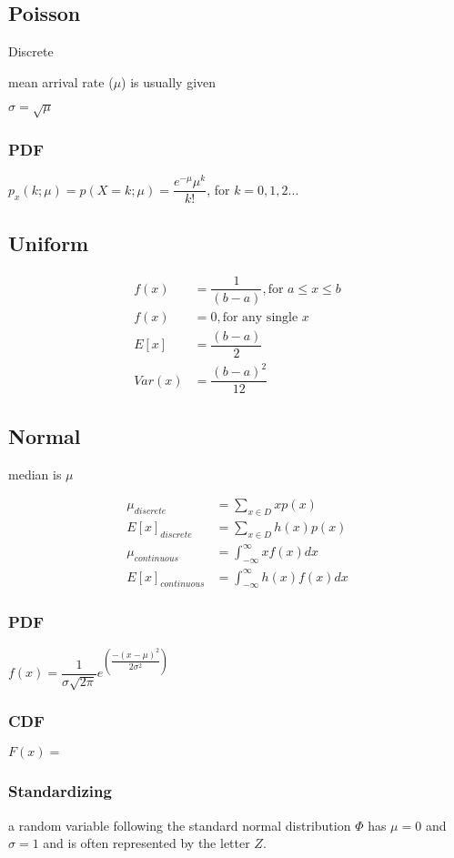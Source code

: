 \documentclass[12pt,fleqn]{article}
\begin{document}
\subsection{Poisson}
Discrete

mean arrival rate ($\mu$) is usually given

$\sigma = \sqrt{\mu}$

\subsubsection{PDF}
$p_x(k;\mu) = p(X=k; \mu) = \dfrac{e^{-\mu}\mu^k}{k!}$, for $k = 0,1,2...$
\subsection{Uniform}

\begin{align*}
	f(x) &= \dfrac{1}{(b-a)}, \text{for $a \le x \le b$}\\
	f(x) &= 0, \text{for any single $x$}\\
	E[x] &= \dfrac{(b-a)}{2}\\
	Var(x) &=\dfrac{(b-a)^2}{12}
\end{align*}

\subsection{Normal}

median is $\mu$

\begin{align*}
	\mu_{discrete} &= \sum_{x \in D} x p(x)\\
	E[x]_{discrete} &= \sum_{x \in D} h(x) p(x)\\
	\mu_{continuous} &= \int_{-\infty}^{\infty} x f(x) dx\\
	E[x]_{continuous} &= \int_{-\infty}^{\infty} h(x) f(x) dx
\end{align*}

\subsubsection{PDF}
$f(x) = \dfrac{1}{\sigma\sqrt{2\pi}}e^{(\dfrac{-(x-\mu)^2}{2\sigma^2})}$
\subsubsection{CDF}
$F(x) = $

\subsubsection{Standardizing}
a random variable following the standard normal distribution $\Phi$ has $\mu = 0$ and $\sigma = 1$ and is often represented by the letter $Z$.
\end{document}
